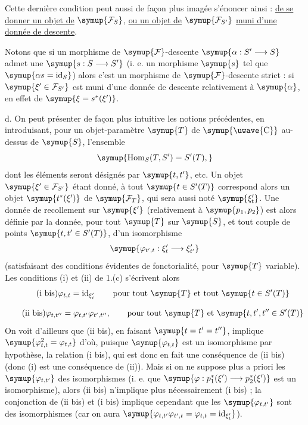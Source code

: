 Cette dernière condition peut aussi de façon plus imagée s'énoncer ainsi :
 \uline{de se donner un objet de} $\symup{\mathcal F_S}$, \uline{ou un objet de}
$\symup{\mathcal F_{S'}}$ \uline{muni d'une donnée de descente}.

Notons que si un morphisme de $\symup{\mathcal F}$-descente $\symup{\alpha:S'\longrightarrow S}$ admet une 
$\symup{s:S\longrightarrow S'}$ (i. e. un morphisme $\symup{s}$ tel que
$\symup{\alpha s=\operatorname{id}_S}$) alors c'est un morphisme de
$\symup{\mathcal F}$-descente strict : si $\symup{\xi'\in\mathcal F_{S'}}$ est muni d'une donnée de
descente relativement à $\symup{\alpha}$,  en effet de
$\symup{\xi=s^*(\xi')}$.

\medskip\noindent
d. On peut présenter de façon plus intuitive les notions précédentes, en
introduisant, pour un objet-paramètre $\symup{T}$ de $\symup{\text{\uwave{C}}}$ au-dessus de $\symup{S}$,
l'ensemble
\[
  \symup{\operatorname{Hom}_S(T,S')=S'(T),}
\]
dont les éléments seront désignés par $\symup{t,t'}$, etc. Un objet
$\symup{\xi'\in\mathcal F_{S'}}$ étant donné, à tout $\symup{t\in S'(T)}$ correspond alors un
objet $\symup{t^*(\xi')}$ de $\symup{\mathcal F_T}$, qui sera aussi noté $\symup{\xi'_t}$. Une donnée de
recollement sur $\symup{\xi'}$ (relativement à $\symup{p_1,p_2}$) est alors définie par la
donnée, pour tout $\symup{T}$ sur $\symup{S}$, et tout couple de points
$\symup{t,t'\in S'(T)}$, d'un isomorphisme
\[
  \symup{\varphi_{t',t}:\xi'_t\longrightarrow\xi'_{t'}}
\]
(satisfaisant des conditions évidentes de fonctorialité, pour $\symup{T}$ variable).
Les conditions (i) et (ii) de 1.(c) s'écrivent alors
\[
  \tag{i bis}
  \varphi_{t,t}=\operatorname{id}_{\xi'_t}
  \qquad\text{pour tout $\symup{T}$ et tout $\symup{t\in S'(T)}$}
\]

\[
  \tag{ii bis}
  \varphi_{t,t''}=\varphi_{t,t'}\varphi_{t',t''},
  \qquad\text{pour tout $\symup{T}$ et $\symup{t,t',t''\in S'(T)}$}
\]
On voit d'ailleurs que (ii bis), en faisant $\symup{t=t'=t''}$, implique
$\symup{\varphi_{t,t}^2=\varphi_{t,t}}$ d'où, puisque $\symup{\varphi_{t,t}}$ est un
isomorphisme par hypothèse, la relation (i bis), qui est donc en fait une
conséquence de (ii bis) (donc (i) est une conséquence de (ii)). Mais si on ne
suppose plus a priori les $\symup{\varphi_{t,t'}}$ des isomorphismes (i. e. que
$\symup{\varphi:p_1^*(\xi')\longrightarrow p_2^*(\xi')}$ est un isomorphisme), alors
(ii bis) n'implique plus nécessairement (i bis) ; la conjonction de (ii bis) et
(i bis) implique cependant que les $\symup{\varphi_{t,t'}}$ sont des isomorphismes (car
on aura
$\symup{\varphi_{t,t'}\varphi_{t',t}=\varphi_{t,t}=\operatorname{id}_{\xi'_t}}$).

